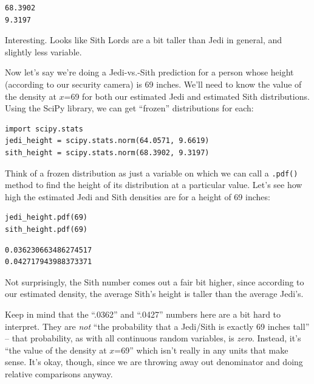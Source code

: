 \begin{Verbatim}[fontsize=\small,samepage=true,frame=leftline,framesep=5mm,framerule=1mm]
68.3902
9.3197
\end{Verbatim}

Interesting. Looks like Sith Lords are a bit taller than Jedi in general, and
slightly less variable.

\vspace{.1in}


Now let's say we're doing a Jedi-vs.-Sith prediction for a person whose height
(according to our security camera) is 69 inches. We'll need to know the value
of the density at $x$=69 for both our estimated Jedi and estimated Sith
distributions. Using the SciPy library, we can get ``frozen'' distributions for
each:


\begin{Verbatim}[fontsize=\small,samepage=true,frame=single,framesep=3mm]
import scipy.stats
jedi_height = scipy.stats.norm(64.0571, 9.6619)
sith_height = scipy.stats.norm(68.3902, 9.3197)
\end{Verbatim}


Think of a frozen distribution as just a variable on which we can call a
\texttt{.pdf()} method to find the height of its distribution at a particular
value. Let's see how high the estimated Jedi and Sith densities are for a
height of 69 inches:

\begin{Verbatim}[fontsize=\small,samepage=true,frame=single,framesep=3mm]
jedi_height.pdf(69)
sith_height.pdf(69)
\end{Verbatim}
\vspace{-.2in}

\begin{Verbatim}[fontsize=\small,samepage=true,frame=leftline,framesep=5mm,framerule=1mm]
0.036230663486274517
0.042717943988373371
\end{Verbatim}

Not surprisingly, the Sith number comes out a fair bit higher, since according
to our estimated density, the average Sith's height is taller than the average
Jedi's.

Keep in mind that the ``.0362'' and ``.0427'' numbers here are a bit hard to
interpret. They are \textit{not} ``the probability that a Jedi/Sith is exactly
69 inches tall'' -- that probability, as with all continuous random variables,
is \textit{zero}. Instead, it's ``the value of the density at $x$=69'' which
isn't really in any units that make sense. It's okay, though, since we are
throwing away out denominator and doing relative comparisons anyway.

